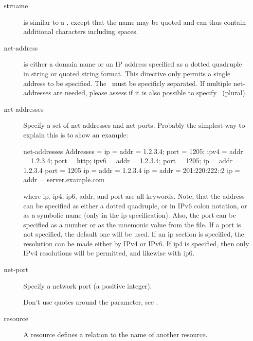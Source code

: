 \begin{description}
\item [strname]
    \label{DataTypeStrname}
is similar to a \dtName, except that the name may be quoted and
can thus contain  additional characters including spaces.


\item [net-address]
    \label{DataTypeNetAddress}
is either a domain name or an IP address specified as a
dotted quadruple in string or quoted string format.
This directive only permits a single address to be specified.
The \dtNetPort\ must be specificly separated.
If multiple net-addresses are needed, please assess if it is also possible to specify \dtNetAddresses\ (plural).


\item [net-addresses]
    \label{DataTypeNetAddresses}
Specify a set of net-addresses and net-ports.
Probably the simplest way to explain
this is to show an example:

\begin{bconfig}{net-addresses}
Addresses  = {
    ip = { addr = 1.2.3.4; port = 1205;}
    ipv4 = {
        addr = 1.2.3.4; port = http;}
    ipv6 = {
        addr = 1.2.3.4;
        port = 1205;
    }
    ip = {
        addr = 1.2.3.4
        port = 1205
    }
    ip = { addr = 1.2.3.4 }
    ip = { addr = 201:220:222::2 }
    ip = {
        addr = server.example.com
    }
}
\end{bconfig}

where ip, ip4, ip6, addr, and port are all keywords. Note, that  the address
can be specified as either a dotted quadruple, or  in IPv6 colon notation, or as
a symbolic name (only in the ip specification).  Also, the port can be specified
as a number or as the mnemonic value from  the  file.  If a port
is not specified, the default one will be used. If an ip  section is specified,
the resolution can be made either by IPv4 or  IPv6. If ip4 is specified, then
only IPv4 resolutions will be permitted,  and likewise with ip6.


\item [net-port]
    \label{DataTypeNetPort}
    Specify a network port (a positive  integer).

    Don't use quotes around the parameter, see .


\item [resource]
    \label{DataTypeRes}
A resource defines a relation to the name of another resource.



\end{description}
